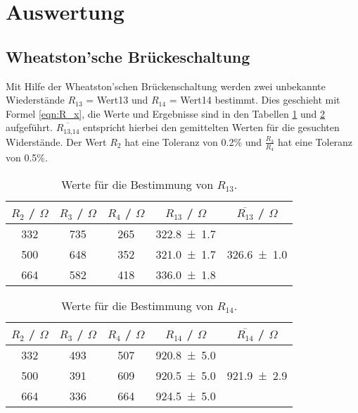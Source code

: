 \section{Auswertung}
\label{sec:Auswertung}

\subsection{Wheatston'sche Brückeschaltung}
Mit Hilfe der Wheatston'schen Brückenschaltung werden zwei unbekannte Wiederstände $R_{13}$ = Wert13 und $R_{14}$ = Wert14 bestimmt. Dies geschieht mit Formel \ref{eqn:R_x}, die Werte und Ergebnisse sind in den Tabellen \ref{tab:Wheat1} und \ref{tab:Wheat2} aufgeführt. $\overline{R_\text{13,14}}$ entspricht hierbei den gemittelten Werten für die gesuchten Widerstände. Der Wert $R_2$ hat eine Toleranz von 0.2\% und $\frac{R_3}{R_4}$ hat eine Toleranz von 0.5\%.

\begin{table}[H] %
  \centering
  \begin{tabular}{c c c c c}
    \toprule
    $R_2$ / $\Omega$ & $R_3$ / $\Omega$ & $R_4$ / $\Omega$ & $R_{13}$ / $\Omega$ & $\overline{R_{13}}$ / $\Omega$ \\
    \midrule
    332 & 735 & 265 & \num{322.8 +- 1.7} &  \\
    500 & 648 & 352 & \num{321.0 +- 1.7} &  \num{326.6 +- 1.0}\\
    664 & 582 & 418 & \num{336.0 +- 1.8} &  \\
  \end{tabular}
  \caption{Werte für die Bestimmung von $R_{13}$.}
  \label{tab:Wheat1}
\end{table}

\begin{table}[H] %
  \centering
  \begin{tabular}{c c c c c}
    \toprule
    $R_2$ / $\Omega$ & $R_3$ / $\Omega$ & $R_4$ / $\Omega$ & $R_{14}$ / $\Omega$ & $\overline{R_{14}}$ / $\Omega$ \\
    \midrule
    332 & 493 & 507 & \num{920.8 +- 5.0} &  \\
    500 & 391 & 609 & \num{920.5 +- 5.0} &  \num{921.9 +- 2.9}\\
    664 & 336 & 664 & \num{924.5 +- 5.0} &  \\
  \end{tabular}
  \caption{Werte für die Bestimmung von $R_{14}$.}
  \label{tab:Wheat2}
\end{table}

